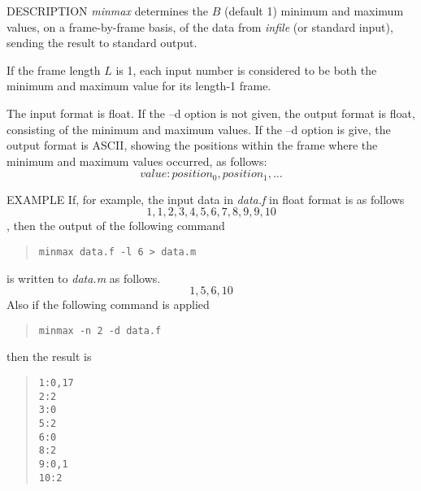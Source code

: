 \begin{synopsis}
 \item [minmax] [ --l $L$ ] [ --n $N$ ] [ --b $B$ ] [ --d ] [ {\em infile} ]
\end{synopsis}

\begin{qsection}{DESCRIPTION}
{\em minmax} determines the $B$ (default 1) minimum and maximum values, 
on a frame-by-frame basis, 
of the data from {\em infile} (or standard input), 
sending the result to standard output.

If the frame length $L$ is 1, 
each input number is considered to be both
the minimum and maximum value for its length-1 frame.

The input format is float. 
If the --d option is not given, 
the output format is float, 
consisting of the minimum and maximum values.
If the --d option is give, 
the output format is ASCII, 
showing the positions within the frame 
where the minimum and maximum values occurred, as follows:
\begin{displaymath}
value:position_0,position_1,\dots
\end{displaymath}
\end{qsection}

\begin{options}
\end{options}

\begin{qsection}{EXAMPLE}
If, for example, the input data in {\em data.f} in float format
is as follows
\[1,1,2,3,4,5,6,7,8,9,9,10\],
then the output of the following command
\begin{quote}
 \verb!minmax data.f -l 6 > data.m!
\end{quote}
is written to {\em data.m} as follows.
\[1,5,6,10\]
Also if the following command is applied
\begin{quote}
 \verb!minmax -n 2 -d data.f!
\end{quote}
then the result is 
\begin{quote}
 \verb!1:0,17!\\
 \verb!2:2!\\
 \verb!3:0!\\
 \verb!5:2!\\
 \verb!6:0!\\
 \verb!8:2!\\
 \verb!9:0,1!\\
 \verb!10:2!
\end{quote}
\end{qsection}
